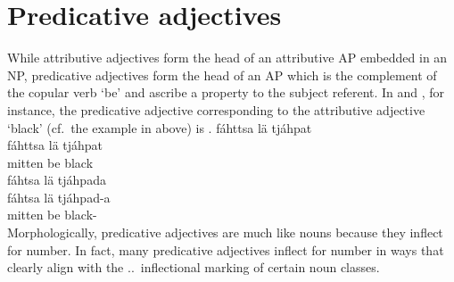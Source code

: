 \section{Predicative adjectives}\label{predADJ}%
While attributive adjectives form the head of an attributive AP embedded in an NP, predicative adjectives form the head of an AP which is the complement of the copular verb  ‘be’ and ascribe a property to the subject referent. %
In  and , for instance, the predicative adjective corresponding to the attributive adjective  ‘black’ (cf.~the example in  above) is . %
\ea\label{adjPredEx1}
\glll	fáhttsa lä tjáhpat\\
	fáhttsa lä tjáhpat\\
	mitten\BS{} be\BS{} black\BS{}\\\nopagebreak
{}	
\z
\ea\label{adjPredEx2}
\glll	fáhtsa lä tjáhpada\\
	fáhtsa lä tjáhpad-a\\
	mitten\BS{} be\BS{} black-\\\nopagebreak
{}	
\z
Morphologically, predicative adjectives are much like nouns because they inflect for number. In fact, many predicative adjectives inflect for number in ways that clearly align with the \NOMs.\SGs\TILDE\NOMs.\PLs\ inflectional marking of certain noun classes. 
